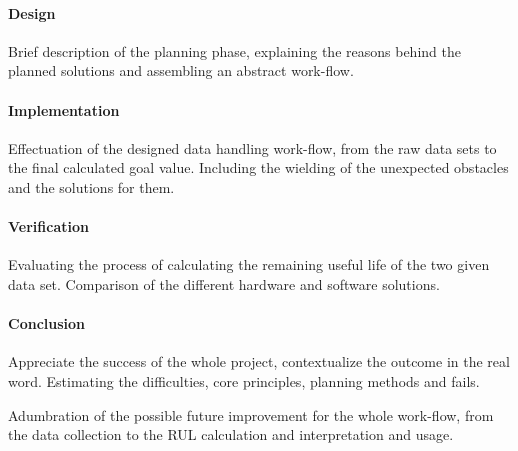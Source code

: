 		\paragraph{Design}

Brief description of the planning phase, explaining the reasons behind the planned solutions and assembling an abstract work-flow.

		\paragraph{Implementation}

Effectuation of the designed data handling work-flow, from the raw data sets to the final calculated goal value. Including the wielding of the unexpected obstacles and the solutions for them.

		\paragraph{Verification}

Evaluating the process of calculating the remaining useful life of the two given data set. Comparison of the different hardware and software solutions.

		\paragraph{Conclusion}

Appreciate the success of the whole project, contextualize the outcome in the real word. Estimating the difficulties, core principles, planning methods and fails.

Adumbration of the possible future improvement for the whole work-flow, from the data collection to the RUL calculation and interpretation and usage.


